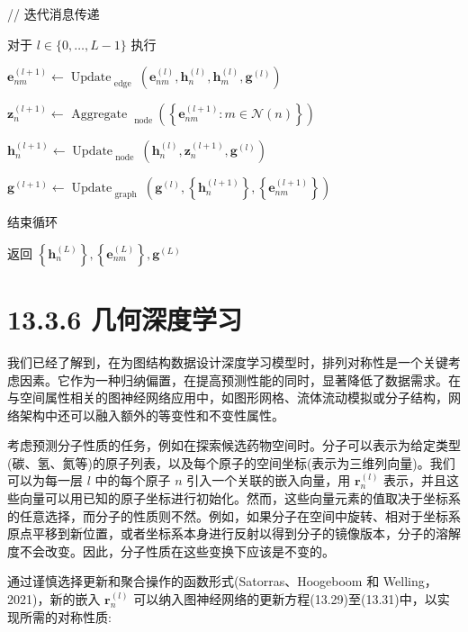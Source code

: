 \documentclass[10pt]{report}
\begin{document}
// 迭代消息传递

对于 \(l \in  \{ 0,\ldots ,L - 1\}\) 执行

\({\mathbf{e}}_{nm}^{\left( l + 1\right) } \leftarrow  {\operatorname{Update}}_{\text{ edge }}\left( {{\mathbf{e}}_{nm}^{\left( l\right) },{\mathbf{h}}_{n}^{\left( l\right) },{\mathbf{h}}_{m}^{\left( l\right) },{\mathbf{g}}^{\left( l\right) }}\right)\)

\({\mathbf{z}}_{n}^{\left( l + 1\right) } \leftarrow  {\text{ Aggregate }}_{\text{ node }}\left( \left\{  {{\mathbf{e}}_{nm}^{\left( l + 1\right) } : m \in  \mathcal{N}\left( n\right) }\right\}  \right)\)

\({\mathbf{h}}_{n}^{\left( l + 1\right) } \leftarrow  {\operatorname{Update}}_{\text{ node }}\left( {{\mathbf{h}}_{n}^{\left( l\right) },{\mathbf{z}}_{n}^{\left( l + 1\right) },{\mathbf{g}}^{\left( l\right) }}\right)\)

\({\mathbf{g}}^{\left( l + 1\right) } \leftarrow  {\operatorname{Update}}_{\text{ graph }}\left( {{\mathbf{g}}^{\left( l\right) },\left\{  {\mathbf{h}}_{n}^{\left( l + 1\right) }\right\}  ,\left\{  {\mathbf{e}}_{nm}^{\left( l + 1\right) }\right\}  }\right)\)

结束循环

返回 \(\left\{  {\mathbf{h}}_{n}^{\left( L\right) }\right\}  ,\left\{  {\mathbf{e}}_{nm}^{\left( L\right) }\right\}  ,{\mathbf{g}}^{\left( L\right) }\)

\section*{13.3.6 几何深度学习}

我们已经了解到，在为图结构数据设计深度学习模型时，排列对称性是一个关键考虑因素。它作为一种归纳偏置，在提高预测性能的同时，显著降低了数据需求。在与空间属性相关的图神经网络应用中，如图形网格、流体流动模拟或分子结构，网络架构中还可以融入额外的等变性和不变性属性。

考虑预测分子性质的任务，例如在探索候选药物空间时。分子可以表示为给定类型(碳、氢、氮等)的原子列表，以及每个原子的空间坐标(表示为三维列向量)。我们可以为每一层 \(l\) 中的每个原子 \(n\) 引入一个关联的嵌入向量，用 \({\mathbf{r}}_{n}^{\left( l\right) }\) 表示，并且这些向量可以用已知的原子坐标进行初始化。然而，这些向量元素的值取决于坐标系的任意选择，而分子的性质则不然。例如，如果分子在空间中旋转、相对于坐标系原点平移到新位置，或者坐标系本身进行反射以得到分子的镜像版本，分子的溶解度不会改变。因此，分子性质在这些变换下应该是不变的。

通过谨慎选择更新和聚合操作的函数形式(Satorras、Hoogeboom 和 Welling，2021)，新的嵌入 \({\mathbf{r}}_{n}^{\left( l\right) }\) 可以纳入图神经网络的更新方程(13.29)至(13.31)中，以实现所需的对称性质:
\end{document}
